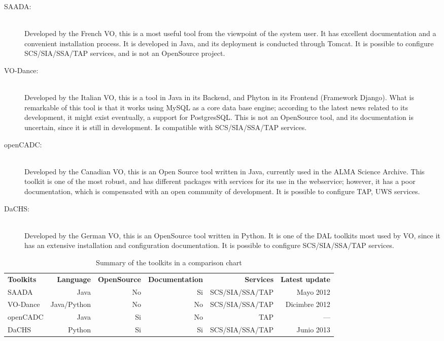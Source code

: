 \documentclass[]{spie}
\begin{document}
\begin{description}
    \item[SAADA:] \hfill \\
        Developed by the French VO, this is a most useful tool from the viewpoint of the system user.  It has excellent documentation and a convenient installation process. It is developed in Java, and its deployment is conducted through Tomcat.  It is possible to configure SCS/SIA/SSA/TAP services, and is not an OpenSource project.
    \item[VO-Dance:] \hfill \\
        Developed by the Italian VO, this is a tool in Java in its Backend, and Phyton in its Frontend (Framework Django). What is remarkable of this tool is that it works using MySQL as a core data base engine; according to the latest news related to its development, it might exist eventually, a support for PostgresSQL.  This is not an OpenSource tool, and its documentation is uncertain, since it is still in development.  Is compatible with SCS/SIA/SSA/TAP services.
    \item[openCADC:] \hfill \\
        Developed by the Canadian VO, this is an Open Source tool written in Java, currently used in the ALMA Science Archive.  This toolkit is one of the most robust, and has different packages with services for its use in the webservice; however, it has a poor documentation, which is compensated with an open community of development.  It is possible to configure TAP, UWS services.
    \item[DaCHS:] \hfill \\
        Developed by the German VO, this is an OpenSource tool written in Python.  It is one of the DAL toolkits most used by VO, since it has an extensive installation and configuration documentation. It is possible to configure SCS/SIA/SSA/TAP services.
\end{description}

\begin{table}[h]
\caption{Summary of the toolkits in a comparison chart} 
\label{table:toolkits}
\begin{center}       
\begin{tabular}{lrrrrr}
    {\bf Toolkits} & {\bf Language} & {\bf OpenSource} & {\bf Documentation} & {\bf Services} & {\bf Latest update}  \\
    SAADA          & Java           & No               & Si                  & SCS/SIA/SSA/TAP & Mayo 2012     \\
    VO-Dance       & Java/Python    & No               & No                  & SCS/SIA/SSA/TAP & Dicimbre 2012 \\
    openCADC       & Java           & Si               & No                  & TAP             & ---           \\
    DaCHS          & Python         & Si               & Si                  & SCS/SIA/SSA/TAP & Junio 2013    \\
\end{tabular}
\end{center}
\end{table}
\end{document}
